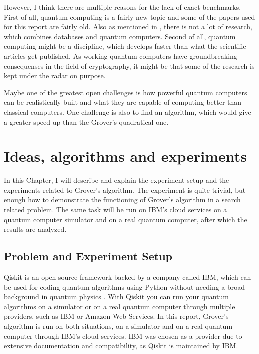 \documentclass[english,oneside,openright]{UH_DS_report}
\begin{document}
However, I think there are multiple reasons for the lack of exact benchmarks. First of all, quantum computing is a fairly new topic and some of the papers used for this report are fairly old. Also as mentioned in \cite{qcdb}, there is not a lot of research, which combines databases and quantum computers. Second of all, quantum computing might be a discipline, which develops faster than what the scientific articles get published. As working quantum computers have groundbreaking consequenses in the field of cryptography, it might be that some of the research is kept under the radar on purpose.

Maybe one of the greatest open challenges is how powerful quantum computers can be realistically built and what they are capable of computing better than classical computers. One challenge is also to find an algorithm, which would give a greater speed-up than the Grover's quadratical one.

\chapter{Ideas, algorithms and experiments}
\label{chapter:ideas}

In this Chapter, I will describe and explain the experiment setup and the experiments related to Grover's algorithm. The experiment is quite trivial, but enough how to demonstrate the functioning of Grover's algorithm in a search related problem. The same task will be run on IBM's cloud services on a quantum computer simulator and on a real quantum computer, after which the results are analyzed.

\section{Problem and Experiment Setup}
Qiskit is an open-source framework backed by a company called IBM, which can be used for coding quantum algorithms using Python without needing a broad background in quantum physics \cite{https://doi.org/10.48550/arxiv.1903.04359}. With Qiskit you can run your quantum algorithms on a simulator or on a real quantum computer through multiple providers, such as IBM or Amazon Web Services. In this report, Grover's algorithm is run on both situations, on a simulator and on a real quantum computer through IBM's cloud services. IBM was chosen as a provider due to extensive documentation and compatibility, as Qiskit is maintained by IBM.
\end{document}
